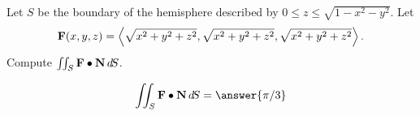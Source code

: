 \documentclass{ximera}
\author{David Guichard \and Neal Koblitz \and H. Jerome Keisler \and Albert Scheller \and Barry Balof \and Mike Wills \and Matthew Carr}
\begin{document}
\begin{exercise}




Let $S$ be the boundary of the hemisphere described by $0\le z\le\sqrt{1-x^2-y^2}$. Let $$\mathbf{F}(x,y,z)=\left\langle \sqrt{x^2+y^2+z^2},\sqrt{x^2+y^2+z^2},\sqrt{x^2+y^2+z^2}\right\rangle\ldotp$$
Compute $\iint_{S}\mathbf{F}\bullet\mathbf{N}\mathop{}\!d\! S$.

\begin{prompt}
\[
\iint_{S}\vec{F}\dotp\vec{N}\d S=\answer{\pi/3}
\]
\end{prompt}


\end{exercise}
\end{document}
